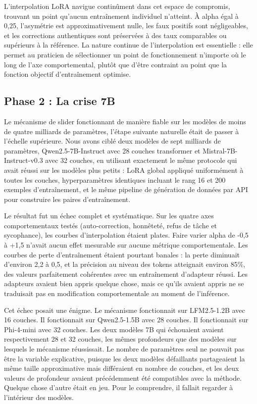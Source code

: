 \documentclass[11pt,a4paper]{article}
\begin{document}
L'interpolation LoRA navigue continûment dans cet espace de compromis, trouvant un point qu'aucun entraînement individuel n'atteint. À alpha égal à 0,25, l'asymétrie est approximativement nulle, les faux positifs sont négligeables, et les corrections authentiques sont préservées à des taux comparables ou supérieurs à la référence. La nature continue de l'interpolation est essentielle : elle permet au praticien de sélectionner un point de fonctionnement n'importe où le long de l'axe comportemental, plutôt que d'être contraint au point que la fonction objectif d'entraînement optimise.

\subsection{Phase 2 : La crise 7B}

Le mécanisme de slider fonctionnant de manière fiable sur les modèles de moins de quatre milliards de paramètres, l'étape suivante naturelle était de passer à l'échelle supérieure. Nous avons ciblé deux modèles de sept milliards de paramètres, Qwen2.5-7B-Instruct avec 28 couches transformer et Mistral-7B-Instruct-v0.3 avec 32 couches, en utilisant exactement le même protocole qui avait réussi sur les modèles plus petits : LoRA global appliqué uniformément à toutes les couches, hyperparamètres identiques incluant le rang 16 et 200 exemples d'entraînement, et le même pipeline de génération de données par API pour construire les paires d'entraînement.

Le résultat fut un échec complet et systématique. Sur les quatre axes comportementaux testés (auto-correction, honnêteté, refus de tâche et sycophance), les courbes d'interpolation étaient plates. Faire varier alpha de -0,5 à +1,5 n'avait aucun effet mesurable sur aucune métrique comportementale. Les courbes de perte d'entraînement étaient pourtant banales : la perte diminuait d'environ 2,2 à 0,5, et la précision au niveau des tokens atteignait environ 85\%, des valeurs parfaitement cohérentes avec un entraînement d'adapteur réussi. Les adapteurs avaient bien appris quelque chose, mais ce qu'ils avaient appris ne se traduisait pas en modification comportementale au moment de l'inférence.

Cet échec posait une énigme. Le mécanisme fonctionnait sur LFM2.5-1.2B avec 16 couches. Il fonctionnait sur Qwen2.5-1.5B avec 28 couches. Il fonctionnait sur Phi-4-mini avec 32 couches. Les deux modèles 7B qui échouaient avaient respectivement 28 et 32 couches, les mêmes profondeurs que des modèles sur lesquels le mécanisme réussissait. Le nombre de paramètres seul ne pouvait pas être la variable explicative, puisque les deux modèles défaillants partageaient la même taille approximative mais différaient en nombre de couches, et les deux valeurs de profondeur avaient précédemment été compatibles avec la méthode. Quelque chose d'autre était en jeu. Pour le comprendre, il fallait regarder à l'intérieur des modèles.
\end{document}
